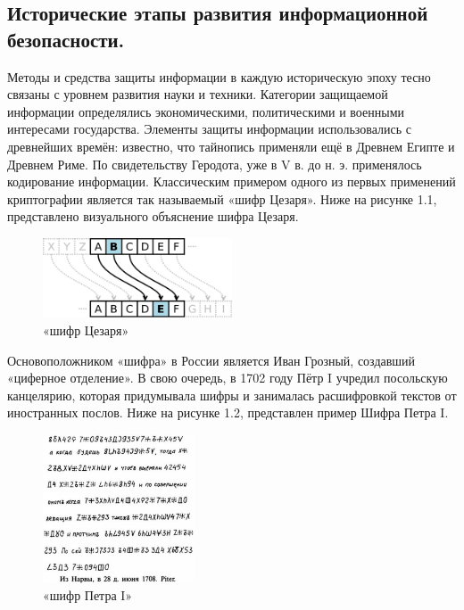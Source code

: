 \subsection{Исторические этапы развития информационной безопасности.}
Методы и средства защиты информации в каждую историческую эпоху тесно связаны с уровнем развития науки и техники. Категории 
защищаемой информации определялись экономическими, политическими и военными интересами государства. Элементы защиты 
информации использовались с древнейших времён: известно, что тайнопись применяли ещё в Древнем Египте и Древнем Риме. По 
свидетельству Геродота, уже в V в. до н. э. применялось кодирование информации. Классическим примером одного из первых 
применений криптографии является так называемый «шифр Цезаря»\cite{urfu}. Ниже на рисунке 1.1, представлено визуального объяснение шифра Цезаря.
\begin{figure}[h]
    \centering
    \includegraphics[width=0.5\textwidth]{pic/2.1.png}
    \caption{«шифр Цезаря»}
\end{figure}

Основоположником «шифра» в России является Иван Грозный, создавший «циферное отделение». В свою очередь, в 1702 году Пётр I 
учредил посольскую канцелярию, которая придумывала шифры и занималась расшифровкой текстов от иностранных послов. Ниже на рисунке 1.2, представлен пример Шифра Петра I.

\begin{figure}[h]
    \centering
    \includegraphics[width=0.4\textwidth]{pic/2.2.jpg}
    \caption{«шифр Петра I»}
\end{figure}

